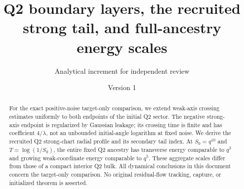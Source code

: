 \documentclass[11pt]{article}
\title{Q2 boundary layers, the recruited strong tail, and full-ancestry energy scales}
\author{Analytical increment for independent review}\date{Version 1}
\theoremstyle{remark}\newtheorem{remark}[theorem]{Remark}
\begin{document}
\maketitle
\begin{abstract}
For the exact positive-noise target-only comparison, we extend weak-axis crossing estimates uniformly to both endpoints of the initial Q2 sector. The negative strong-axis endpoint is regularized by Gaussian leakage; its crossing time is finite and has coefficient $4/\lambda$, not an unbounded initial-angle logarithm at fixed noise. We derive the recruited Q2 strong-chart radial profile and its secondary tail index. At $S_0=q^{10}$ and $T=\log(1/S_0)$, the entire fixed Q2 ancestry has transverse energy comparable to $q^3$ and growing weak-coordinate energy comparable to $q^5$. These aggregate scales differ from those of a compact interior Q2 bulk. All dynamical conclusions in this document concern the target-only comparison. No original residual-flow tracking, capture, or initialized theorem is asserted.
\end{abstract}
\end{document}
